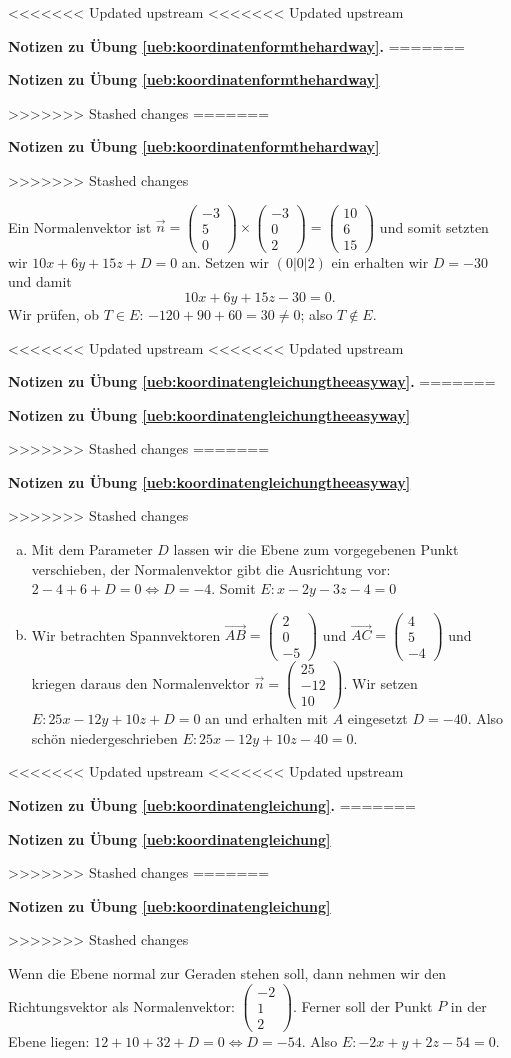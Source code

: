 \documentclass[%
11pt,%
twoside,%
titlepage,%
<<<<<<< Updated upstream
<<<<<<< Updated upstream
german,%
=======
swissgerman,%
>>>>>>> Stashed changes
=======
swissgerman,%
>>>>>>> Stashed changes
headsepline%
]{scrartcl}
\newcommand{\faReturnGray}{\textcolor{gray}{\faMailReply}} %
\newcommand{\faReturnGray}{\textcolor{gray}{\faMailReply}} %
\theoremstyle{definition}
\theoremstyle{plain}
\newcommand{\concatueb}[1]{ueb:#1}%
\newcommand{\concatlsg}[1]{lsg:#1}%
\newenvironment{lsg}[1]{%
<<<<<<< Updated upstream
<<<<<<< Updated upstream
    \par\noindent\textbf{Notizen zu Übung \ref{\concatueb{#1}}.}%
    \label{\concatlsg{#1}}
=======
    \par\noindent\textbf{Notizen zu Übung \ref{\concatueb{#1}}}\label{\concatlsg{#1}}
    \hfill\hyperref[\concatueb{#1}]{\faReturnGray}\par %
>>>>>>> Stashed changes
=======
    \par\noindent\textbf{Notizen zu Übung \ref{\concatueb{#1}}}\label{\concatlsg{#1}}
    \hfill\hyperref[\concatueb{#1}]{\faReturnGray}\par %
>>>>>>> Stashed changes
}{%
    \par%
}
\begin{document}
\begin{lsg}{koordinatenformthehardway}
Ein Normalenvektor ist $\vec{n}=\begin{pmatrix}
    -3\\5\\0
\end{pmatrix}\times\begin{pmatrix}
    -3\\0\\2
\end{pmatrix}=\begin{pmatrix}
    10\\6\\15
\end{pmatrix}$
und somit setzten wir $10x+6y+15z+D=0$ an. Setzen wir $(0|0|2)$ ein erhalten wir $D=-30$ und damit
$$10x+6y+15z-30=0.$$
Wir prüfen, ob $T\in E$: $-120+90+60=30\neq0$; also $T\not\in E$.
\end{lsg}
\begin{lsg}{koordinatengleichungtheeasyway}
\begin{enumerate}[a)]
    \item Mit dem Parameter $D$ lassen wir die Ebene zum vorgegebenen Punkt verschieben, der Normalenvektor gibt die Ausrichtung vor: $2-4+6+D=0\Leftrightarrow D=-4$. Somit $E:x-2y-3z-4=0$

    \item Wir betrachten Spannvektoren $\vec{AB}=\begin{pmatrix}
        2\\0\\-5
    \end{pmatrix}$ und $\vec{AC}=\begin{pmatrix}
        4\\5\\-4
    \end{pmatrix}$ und kriegen daraus den Normalenvektor $\vec{n}=\begin{pmatrix}
        25\\-12\\10
    \end{pmatrix}$. Wir setzen $E:25x-12y+10z+D=0$ an und erhalten mit $A$ eingesetzt $D=-40$. Also schön niedergeschrieben $E:25x-12y+10z-40=0$.
\end{enumerate}
\end{lsg}
\begin{lsg}{koordinatengleichung}
Wenn die Ebene normal zur Geraden stehen soll, dann nehmen wir den Richtungsvektor als Normalenvektor: $\begin{pmatrix}
    -2\\1\\2
\end{pmatrix}$. Ferner soll der Punkt $P$ in der Ebene liegen: $12+10+32+D=0\Leftrightarrow D=-54$. Also $E: -2x+y+2z-54=0$.
\end{lsg}
\end{document}
